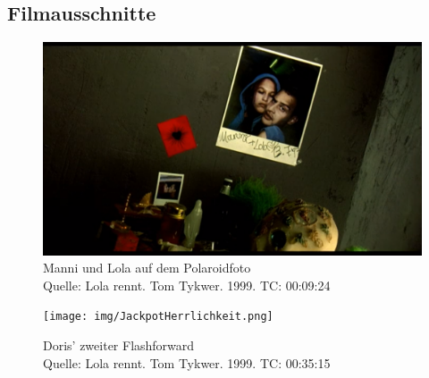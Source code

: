 \begin{appendix} 
\renewcommand{\thesubsection}{\Alph{subsection}}
\renewcommand\thefigure{\thesubsection.\arabic{figure}}   %
\renewcommand\section{\stdsection}

\newpage

\section*{Anhang} 


\setcounter{figure}{0}    


\subsection{Filmausschnitte} 
\label{lab:Filmausschnitte}

\begin{figure}[htbp]
	\centering
		\includegraphics[width=1.00\textwidth]{img/ManniUndLola.png}
	\caption[Manni und Lola auf dem Polaroidfoto]{Manni und Lola auf dem Polaroidfoto \\Quelle: Lola rennt. Tom Tykwer. 1999. TC: 00:09:24}
	\label{fig:ManniUndLola}
\end{figure}

\begin{figure}[htbp]
	\centering
		\texttt{[image: img/JackpotHerrlichkeit.png]}
	\caption[Doris' zweiter Flashforward]{Doris' zweiter Flashforward \\Quelle: Lola rennt. Tom Tykwer. 1999. TC: 00:35:15}
	\label{fig:DorisZweiterFlashforward}
\end{figure}


\end{appendix}
